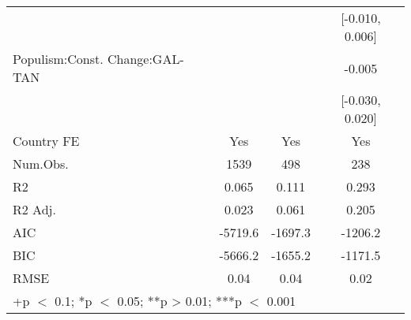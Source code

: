 \begin{table}
\begin{tabular}[t]{lccc}
 &  &  & {}[-0.010, 0.006]\\
Populism:Const. Change:GAL-TAN &  &  & -0.005\\
 &  &  & {}[-0.030, 0.020]\\
\midrule
Country FE & Yes & Yes & Yes\\
Num.Obs. & 1539 & 498 & 238\\
R2 & 0.065 & 0.111 & 0.293\\
R2 Adj. & 0.023 & 0.061 & 0.205\\
AIC & -5719.6 & -1697.3 & -1206.2\\
BIC & -5666.2 & -1655.2 & -1171.5\\
RMSE & 0.04 & 0.04 & 0.02\\
\bottomrule
\multicolumn{4}{l}{\rule{0pt}{1em}+p $<$ 0.1; *p $<$ 0.05; **p > 0.01; ***p $<$ 0.001}\\
\end{tabular}
\end{table}
